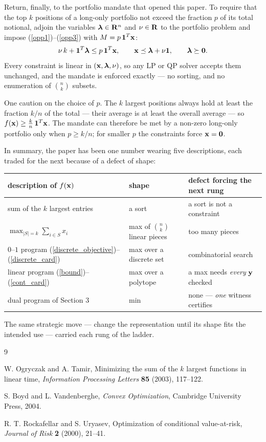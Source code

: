 \documentclass[12pt]{article}
\begin{document}
Return, finally, to the portfolio mandate that opened this paper.  To
require that the top $k$ positions of a long-only portfolio not exceed
the fraction $p$ of its total notional, adjoin the variables
${\boldsymbol \lambda} \in {\bf R}^n$ and $\nu \in {\bf R}$ to the
portfolio problem and impose (\ref{opp1})--(\ref{opp3}) with
$M = p \, {\bf 1}^T {\bf x}$:
\begin{align*}
	\nu \, k + {\bf 1}^T {\boldsymbol \lambda} \le p \, {\bf 1}^T {\bf x},
	\qquad
	{\bf x} \preceq {\boldsymbol \lambda} + \nu {\bf 1},
	\qquad
	{\boldsymbol \lambda} \succeq {\bf 0}.
\end{align*}
Every constraint is linear in $({\bf x}, {\boldsymbol \lambda}, \nu)$, so
any LP or QP solver accepts them unchanged, and the mandate is enforced
exactly --- no sorting, and no enumeration of $\binom{n}{k}$ subsets.

One caution on the choice of $p$.  The $k$ largest positions always hold at
least the fraction $k/n$ of the total --- their average is at least the
overall average --- so $f({\bf x}) \ge \frac{k}{n} \, {\bf 1}^T {\bf x}$.
The mandate can therefore be met by a non-zero long-only portfolio only
when $p \ge k/n$; for smaller $p$ the constraints force ${\bf x} = {\bf 0}$.

In summary, the paper has been one number wearing five descriptions, each
traded for the next because of a defect of shape:
\begin{center}
\begin{tabular}{l|l|l}
description of $f({\bf x})$ & shape & defect forcing the next rung \\ \hline
sum of the $k$ largest entries & a sort & a sort is not a constraint \\
$\max_{|S|=k} \sum_{i \in S} x_i$ & max of $\binom{n}{k}$ linear pieces & too many pieces \\
$0$--$1$ program (\ref{discrete_objective})--(\ref{discrete_card}) & max over a discrete set & combinatorial search \\
linear program (\ref{bound})--(\ref{cont_card}) & max over a polytope & a max needs {\it every\/} ${\bf y}$ checked \\
dual program of Section 3 & min & none --- {\it one\/} witness certifies \\
\end{tabular}
\end{center}
The same strategic move --- change the representation until its shape
fits the intended use --- carried each rung of the ladder.

\begin{thebibliography}{9}

 W. Ogryczak and A. Tamir, Minimizing the sum of
the $k$ largest functions in linear time, {\it Information Processing
Letters} {\bf 85} (2003), 117--122.

 S. Boyd and L. Vandenberghe, {\it Convex Optimization},
Cambridge University Press, 2004.

 R. T. Rockafellar and S. Uryasev,
Optimization of conditional value-at-risk, {\it Journal of Risk}
{\bf 2} (2000), 21--41.

\end{thebibliography}
\end{document}
